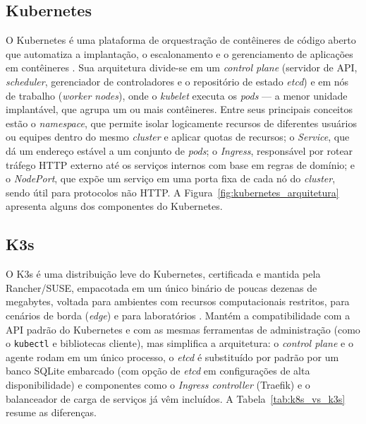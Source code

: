 \subsection{Kubernetes}
\label{sec:kubernetes}

O Kubernetes é uma plataforma de orquestração de contêineres de código aberto que automatiza a implantação, o escalonamento e o gerenciamento de aplicações em contêineres \cite{kubernetesDocs:online}. Sua arquitetura divide-se em um \textit{control plane} (servidor de API, \textit{scheduler}, gerenciador de controladores e o repositório de estado \textit{etcd}) e em nós de trabalho (\textit{worker nodes}), onde o \textit{kubelet} executa os \textit{pods} — a menor unidade implantável, que agrupa um ou mais contêineres. Entre seus principais conceitos estão o \textit{namespace}, que permite isolar logicamente recursos de diferentes usuários ou equipes dentro do mesmo \textit{cluster} e aplicar quotas de recursos; o \textit{Service}, que dá um endereço estável a um conjunto de \textit{pods}; o \textit{Ingress}, responsável por rotear tráfego HTTP externo até os serviços internos com base em regras de domínio; e o \textit{NodePort}, que expõe um serviço em uma porta fixa de cada nó do \textit{cluster}, sendo útil para protocolos não HTTP. A Figura~\ref{fig:kubernetes_arquitetura} apresenta alguns dos componentes do Kubernetes.


\subsection{K3s}
\label{sec:k3s}

O K3s é uma distribuição leve do Kubernetes, certificada e mantida pela Rancher/SUSE, empacotada em um único binário de poucas dezenas de megabytes, voltada para ambientes com recursos computacionais restritos, para cenários de borda (\textit{edge}) e para laboratórios \cite{k3sDocs:online}. Mantém a compatibilidade com a API padrão do Kubernetes e com as mesmas ferramentas de administração (como o \texttt{kubectl} e bibliotecas cliente), mas simplifica a arquitetura: o \textit{control plane} e o agente rodam em um único processo, o \textit{etcd} é substituído por padrão por um banco SQLite embarcado (com opção de \textit{etcd} em configurações de alta disponibilidade) e componentes como o \textit{Ingress controller} (Traefik) e o balanceador de carga de serviços já vêm incluídos. A Tabela~\ref{tab:k8s_vs_k3s} resume as diferenças.

